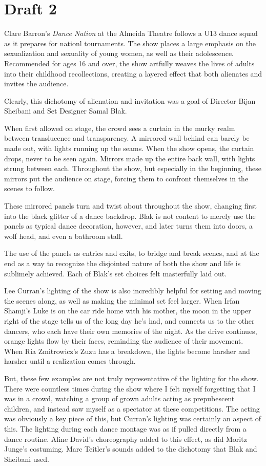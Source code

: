 \documentclass[12pt]{article}[titlepage]
\newcommand{\1}{\={a}}
\newcommand{\2}{\={e}}
\newcommand{\3}{\={\i}}
\newcommand{\4}{\=o}
\newcommand{\5}{\=u}
\newcommand{\6}{\={A}}
\renewcommand{\,}{\textsuperscript{,}}
\begin{document}
\section{Draft 2}
Clare Barron's \textit{Dance Nation} at the Almeida Theatre follows a U13 dance squad as it prepares for nationl tournaments.
The show places a large emphasis on the sexualization and sexuality of young women, as well as their adolescence.
Recommended for ages 16 and over, the show artfully weaves the lives of adults into their childhood recollections, creating a layered effect that both alienates and invites the audience.

Clearly, this dichotomy of alienation and invitation was a goal of Director Bijan Sheibani and Set Designer Samal Blak.

When first allowed on stage, the crowd sees a curtain in the murky realm between translucence and transparency.
A mirrored wall behind can barely be made out, with lights running up the seams.
When the show opens, the curtain drops, never to be seen again.
Mirrors made up the entire back wall, with lights strung between each.
Throughout the show, but especially in the beginning, these mirrors put the audience on stage, forcing them to confront themselves in the scenes to follow.

These mirrored panels turn and twist about throughout the show, changing first into the black glitter of a dance backdrop.
Blak is not content to merely use the panels as typical dance decoration, however, and later turns them into doors, a wolf head, and even a bathroom stall.

The use of the panels as entries and exits, to bridge and break scenes, and at the end as a way to recognize the disjointed nature of both the show and life is sublimely achieved.
Each of Blak's set choices felt masterfully laid out.

Lee Curran's lighting of the show is also incredibly helpful for setting and moving the scenes along, as well as making the minimal set feel larger.
When Irfan Shamji's Luke is on the car ride home with his mother, the moon in the upper right of the stage tells us of the long day he's had, and connects us to the other dancers, who each have their own memories of the night.
As the drive continues, orange lights flow by their faces, reminding the audience of their movement.
When Ria Zmitrowicz's Zuzu has a breakdown, the lights become harsher and harsher until a realization comes through.

But, these few examples are not truly representative of the lighting for the show.
There were countless times during the show where I felt myself forgetting that I was in a crowd, watching a group of grown adults acting as prepubescent children, and instead saw myself as a spectator at these competitions.
The acting was obviously a key piece of this, but Curran's lighting was certainly an aspect of this.
The lighting during each dance montage was as if pulled directly from a dance routine.
Aline David's choreography added to this effect, as did Moritz Junge's costuming.
Marc Teitler's sounds added to the dichotomy that Blak and Sheibani used.
\end{document}
